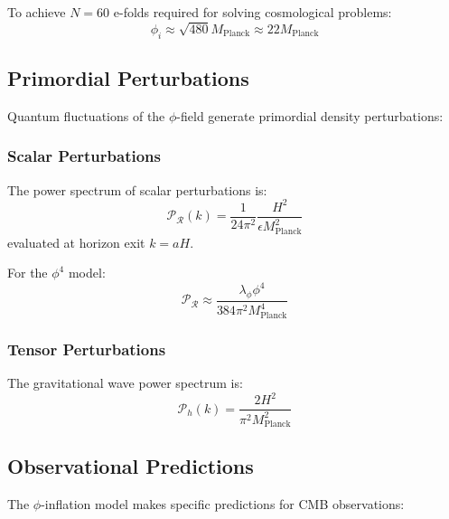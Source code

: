 To achieve $N = 60$ e-folds required for solving cosmological problems:
\begin{equation}
\phi_i \approx \sqrt{480} M_{\text{Planck}} \approx 22 M_{\text{Planck}}
\end{equation}

\subsection{Primordial Perturbations}

Quantum fluctuations of the $\phi$-field generate primordial density perturbations:

\subsubsection{Scalar Perturbations}

\begin{theorem}
The power spectrum of scalar perturbations is:
\begin{equation}
\mathcal{P}_\mathcal{R}(k) = \frac{1}{24\pi^2} \frac{H^2}{\epsilon M_{\text{Planck}}^2}
\label{eq:scalar_power_spectrum}
\end{equation}
evaluated at horizon exit $k = aH$.
\end{theorem}

For the $\phi^4$ model:
\begin{equation}
\mathcal{P}_\mathcal{R} \approx \frac{\lambda_\phi \phi^4}{384\pi^2 M_{\text{Planck}}^4}
\end{equation}

\subsubsection{Tensor Perturbations}

\begin{theorem}
The gravitational wave power spectrum is:
\begin{equation}
\mathcal{P}_h(k) = \frac{2H^2}{\pi^2 M_{\text{Planck}}^2}
\label{eq:tensor_power_spectrum}
\end{equation}
\end{theorem}

\subsection{Observational Predictions}

The $\phi$-inflation model makes specific predictions for CMB observations:

